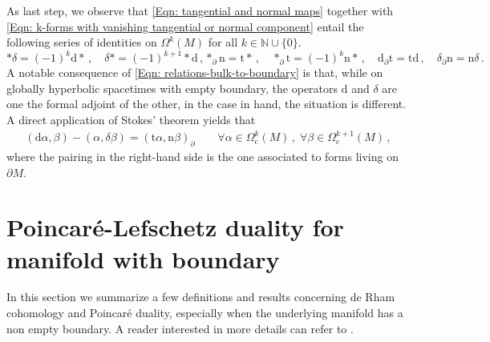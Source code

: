 \noindent As last step, we observe that \eqref{Eqn: tangential and normal maps} together with \eqref{Eqn: k-forms with vanishing tangential or normal component} entail the following series of identities on $\Omega^k(M)$ for all $k\in\mathbb{N}\cup\{0\}$.
\begin{subequations}\label{Eqn: relations between d,delta,t,n}
	\begin{equation}\label{Eqn: relations-bulk}
	\ast\delta=(-1)^k\mathrm{d}\ast\,,\quad
	\delta\ast=(-1)^{k+1}\ast\mathrm{d}\,,
	\end{equation}
	\begin{equation}\label{Eqn: relations-bulk-to-boundary}
	\ast_\partial\mathrm{n}=\mathrm{t}\ast\,,\quad
	\ast_\partial\mathrm{t}=(-1)^k\mathrm{n}\ast\,,\quad
	\mathrm{d}_\partial\mathrm{t}=\mathrm{t}\mathrm{d}\,,\quad
	\delta_\partial\mathrm{n}=\mathrm{n}\delta\,.
	\end{equation}
\end{subequations}
A notable consequence of \eqref{Eqn: relations-bulk-to-boundary} is that, while on globally hyperbolic spacetimes with empty boundary, the operators $\mathrm{d}$ and $\delta$ are one the formal adjoint of the other, in the case in hand, the situation is different. A direct application of Stokes' theorem yields that 
\begin{align}\label{Eqn: boundary terms for delta and d}
(\mathrm{d}\alpha,\beta)-(\alpha,\delta\beta)=
(\mathrm{t}\alpha,\mathrm{n}\beta)_\partial\qquad
\forall\alpha\in\Omega_{\mathrm{c}}^k(M)\,,\;
\forall\beta\in\Omega_{\mathrm{c}}^{k+1}(M)\,,
\end{align}
where the pairing in the right-hand side is the one associated to forms living on $\partial M$.


\section{Poincar\'e-Lefschetz duality for manifold with boundary}\label{Sec: Poincare duality for manifold with boundary}

In this section we summarize a few definitions and results concerning de Rham cohomology and Poincar\'e duality, especially when the underlying manifold has a non empty boundary. A reader interested in more details can refer to \cite{Bott-Tu-82,Schwarz-95}. 

